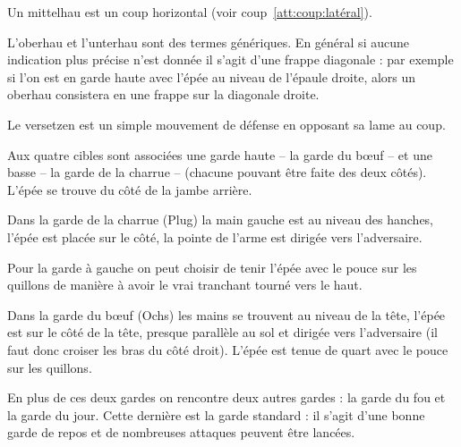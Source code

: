 \begin{coup}
\label{épée-longue:coup:mittelhau}

Un mittelhau est un coup horizontal (voir coup~\ref{att:coup:latéral}).
\end{coup}


L'oberhau et l'unterhau sont des termes génériques.
En général si aucune indication plus précise n'est donnée il s'agit d'une frappe diagonale : par exemple si l'on est en garde haute avec l'épée au niveau de l'épaule droite, alors un oberhau consistera en une frappe sur la diagonale droite.


\begin{garde}[Versetzen]

Le versetzen est un simple mouvement de défense en opposant sa lame au coup.
\end{garde}


Aux quatre cibles sont associées une garde haute -- la garde du bœuf -- et une basse -- la garde de la charrue -- (chacune pouvant être faite des deux côtés).
L'épée se trouve du côté de la jambe arrière.


\begin{garde}

Dans la garde de la charrue (Plug) la main gauche est au niveau des hanches, l'épée est placée sur le côté, la pointe de l'arme est dirigée vers l'adversaire.
\end{garde}


Pour la garde à gauche on peut choisir de tenir l'épée avec le pouce sur les quillons de manière à avoir le vrai tranchant tourné vers le haut.


\begin{garde}

Dans la garde du bœuf (Ochs) les mains se trouvent au niveau de la tête, l'épée est sur le côté de la tête, presque parallèle au sol et dirigée vers l'adversaire (il faut donc croiser les bras du côté droit).
L'épée est tenue de quart avec le pouce sur les quillons.
\end{garde}


En plus de ces deux gardes on rencontre deux autres gardes : la garde du fou et la garde du jour.
Cette dernière est la garde standard : il s'agit d'une bonne garde de repos et de nombreuses attaques peuvent être lancées.


